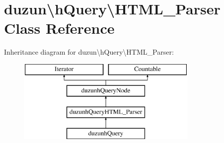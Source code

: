 \hypertarget{classduzun_1_1hQuery_1_1HTML__Parser}{}\section{duzun\textbackslash{}h\+Query\textbackslash{}H\+T\+M\+L\+\_\+\+Parser Class Reference}
\label{classduzun_1_1hQuery_1_1HTML__Parser}
Inheritance diagram for duzun\textbackslash{}h\+Query\textbackslash{}H\+T\+M\+L\+\_\+\+Parser\+:\begin{figure}[H]
\begin{center}
\leavevmode
\includegraphics[height=4.000000cm]{classduzun_1_1hQuery_1_1HTML__Parser}
\end{center}
\end{figure}
